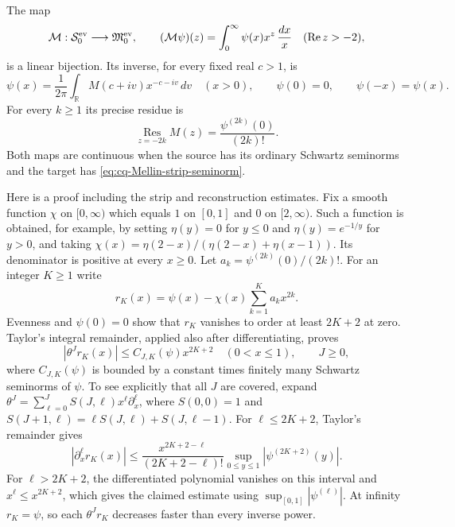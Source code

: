 The map
\begin{equation}\label{eq:cq-Mellin-isomorphism}
 \mathcal M:\mathcal S_0^{\rm ev}\longrightarrow
                 \mathfrak M_0^{\rm ev},\qquad
 (\mathcal M\psi)(z)=\int_0^\infty\psi(x)x^z\,\frac{dx}{x}
 \quad(\operatorname{Re}z>-2),
\end{equation}
is a linear bijection. Its inverse, for every fixed real $c>1$, is
\begin{equation}\label{eq:cq-Mellin-reconstruction}
 \psi(x)=\frac1{2\pi}\int_{\mathbb R}
              M(c+iv)x^{-c-iv}\,dv\quad(x>0),
 \qquad \psi(0)=0,\qquad\psi(-x)=\psi(x).
\end{equation}
For every $k\geq1$ its precise residue is
\begin{equation}\label{eq:cq-Mellin-Taylor-residue}
 \operatorname*{Res}_{z=-2k}M(z)
       =\frac{\psi^{(2k)}(0)}{(2k)!}.
\end{equation}
Both maps are continuous when the source has its ordinary Schwartz
seminorms and the target has \eqref{eq:cq-Mellin-strip-seminorm}.

Here is a proof including the strip and reconstruction estimates.
Fix a smooth function $\chi$ on $[0,\infty)$ which equals $1$
on $[0,1]$ and $0$ on $[2,\infty)$. Such a function is obtained,
for example, by setting $\eta(y)=0$ for $y\leq0$ and
$\eta(y)=e^{-1/y}$ for $y>0$, and taking
$\chi(x)=\eta(2-x)/(\eta(2-x)+\eta(x-1))$. Its denominator is
positive at every $x\geq0$. Let
$a_k=\psi^{(2k)}(0)/(2k)!$. For an integer $K\geq1$ write
\[
 r_K(x)=\psi(x)-\chi(x)\sum_{k=1}^K a_kx^{2k}.
\]
Evenness and $\psi(0)=0$ show that $r_K$ vanishes to order
at least $2K+2$ at zero. Taylor's integral remainder, applied
also after differentiating, proves
\[
 |\theta^Jr_K(x)|\leq C_{J,K}(\psi)x^{2K+2}
 \quad(0<x\leq1),\qquad J\geq0,
\]
where $C_{J,K}(\psi)$ is bounded by a constant times finitely
many Schwartz seminorms of $\psi$. To see explicitly that all
$J$ are covered, expand
$\theta^J=\sum_{\ell=0}^J S(J,\ell)x^\ell\partial_x^\ell$,
where $S(0,0)=1$ and
$S(J+1,\ell)=\ell S(J,\ell)+S(J,\ell-1)$. For
$\ell\leq2K+2$, Taylor's remainder gives
\[
 |\partial_x^\ell r_K(x)|
 \leq\frac{x^{2K+2-\ell}}{(2K+2-\ell)!}
              \sup_{0\leq y\leq1}|\psi^{(2K+2)}(y)|.
\]
For $\ell>2K+2$, the differentiated polynomial vanishes on
this interval and $x^\ell\leq x^{2K+2}$, which gives the
claimed estimate using $\sup_{[0,1]}|\psi^{(\ell)}|$.
At infinity $r_K=\psi$, so each $\theta^Jr_K$ decreases
faster than every inverse power.

